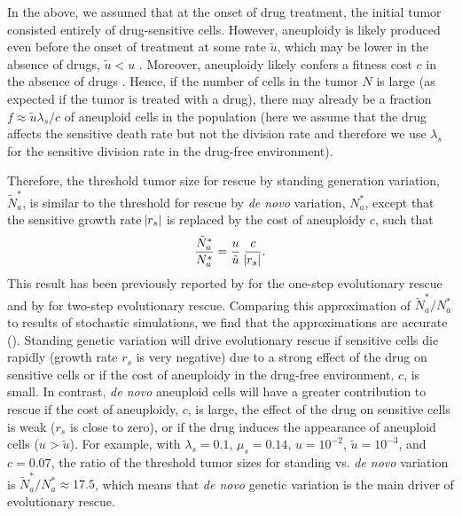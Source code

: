 \documentclass[12pt]{extarticle}
\renewcommand{\Delta}{r}
\begin{document}
In the above, we assumed that at the onset of drug treatment, the initial tumor consisted entirely of drug-sensitive cells.
However, aneuploidy is likely produced even before the onset of treatment at some rate $\tilde{u}$, which may be lower in the absence of drugs, $\tilde{u} < u$ \citep{wang2019molecular,mason2017functional}. Moreover, aneuploidy likely confers a fitness cost $c$ in the absence of drugs \citep{replogle2020aneuploidy,giam2015aneuploidy}.
Hence, if the number of cells in the tumor $N$ is large (as expected if the tumor is treated with a drug), there may already be a fraction $f \approx \tilde{u}\lambda_s/c$ of aneuploid cells in the population (here we assume that the drug affects the sensitive death rate but not the division rate and therefore we use $\lambda_s$ for the sensitive division rate in the drug-free environment).

Therefore, the threshold tumor size for rescue by standing generation variation, $\tilde{N}^*_{a}$, is similar to the threshold for rescue by \textit{de novo} variation, $N^*_a$, except that the sensitive growth rate $\abs{\Delta_s}$ is replaced by the cost of aneuploidy $c$, such that
\begin{equation}\label{eq:Nsgv}
\frac{\tilde{N}^*_{a}}{N^*_{a}} = \frac{u}{\tilde{u}} \; \frac{c}{\abs{\Delta_s}}.
\end{equation}
This result has been previously reported by \citet{orr2008population} for the one-step evolutionary rescue and by \citet{martin2013probability} for two-step evolutionary rescue. %
Comparing this approximation of $\tilde{N}^*_{a}/N^*_{a}$ to results of stochastic simulations, we find that the approximations are accurate (). 
Standing genetic variation will drive evolutionary rescue if sensitive cells die rapidly (growth rate $\Delta_s$ is very negative) due to a strong effect of the drug on sensitive cells or if the cost of aneuploidy in the drug-free environment, $c$, is small.  
In contrast, \textit{de novo} aneuploid cells will have a greater contribution to rescue if the cost of aneuploidy, $c$, is large, the effect of the drug on sensitive cells is weak ($\Delta_s$ is close to zero), or if the drug induces the appearance of aneuploid cells ($u > \tilde u$).
For example, with  $\lambda_s=0.1$, $\mu_s=0.14$, $u=10^{-2}$, $\tilde{u}=10^{-3}$, and $c=0.07$, the ratio of the threshold tumor sizes for standing vs. \textit{de novo} variation is $\tilde{N}^*_a/N^*_a \approx 17.5$, which means that \textit{de novo} genetic variation is  the main driver of evolutionary rescue.
\end{document}
